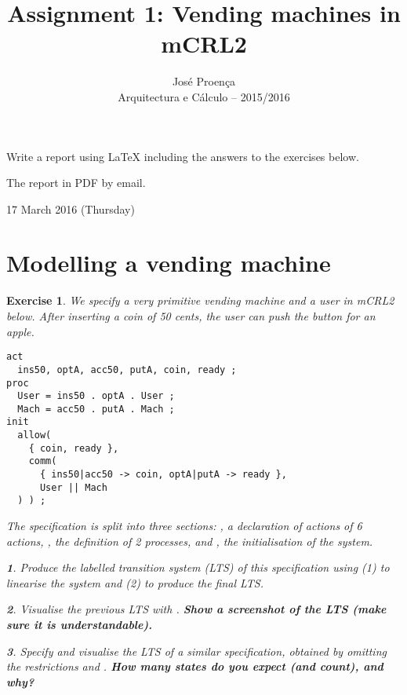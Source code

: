 \documentclass[11pt]{article}
\theoremstyle{myplain}
\newtheorem{exercise}{Exercise}
\theoremstyle{definition} %
\newtheorem{subexercise}{}[exercise]
\newcommand{\subex}[1]{\begin{subexercise}#1\end{subexercise}}
\begin{document}
 
 
\title{Assignment 1: Vending machines in mCRL2}
\author{Jos\'{e} Proen\c{c}a\\
Arquitectura e C\'alculo -- 2015/2016} 


\maketitle


 Write a report using LaTeX including the answers to the exercises below.

 The report in PDF by email.

 17 March 2016 (Thursday)
 
\section*{Modelling a vending machine}

\begin{exercise} \label{ex:vm1}
We specify a very primitive vending machine and a user in mCRL2 below. 
After inserting a coin of 50 cents, the user can push the button for an apple.

\begin{lstlisting}
act
  ins50, optA, acc50, putA, coin, ready ;
proc
  User = ins50 . optA . User ;
  Mach = acc50 . putA . Mach ;
init
  allow(
    { coin, ready },
    comm(
      { ins50|acc50 -> coin, optA|putA -> ready },
      User || Mach
  ) ) ;  
\end{lstlisting}  

The specification is split into three sections:
, a declaration of actions of 6 actions,
, the definition of 2 processes, and
, the initialisation of the system.


\subex{
Produce the labelled transition system (LTS) of this specification using (1) \bash{mcrl22lps} to linearise the system and (2) \bash{lps2lts} to produce the final LTS.}

\subex{Visualise the previous LTS with .
\textbf{Show a screenshot of the LTS (make sure it is understandable).}}

\subex{Specify and visualise the LTS of a similar specification, obtained by omitting the restrictions \code{allow} and \code{comm}.
\textbf{How many states do you expect (and count), and why?}}

\end{exercise}
\end{document}
